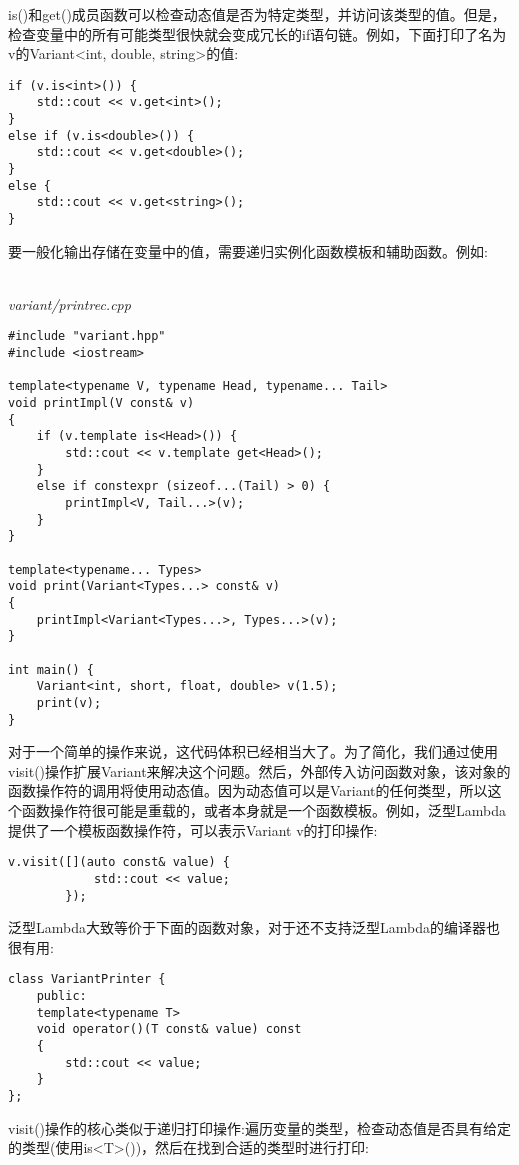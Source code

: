 
is()和get()成员函数可以检查动态值是否为特定类型，并访问该类型的值。但是，检查变量中的所有可能类型很快就会变成冗长的if语句链。例如，下面打印了名为v的Variant<int, double, string>的值:

\begin{lstlisting}[style=styleCXX]
if (v.is<int>()) {
	std::cout << v.get<int>();
}
else if (v.is<double>()) {
	std::cout << v.get<double>();
}
else {
	std::cout << v.get<string>();
}
\end{lstlisting}

要一般化输出存储在变量中的值，需要递归实例化函数模板和辅助函数。例如:

\hspace*{\fill} \\ %
\noindent
\textit{variant/printrec.cpp}
\begin{lstlisting}[style=styleCXX]
#include "variant.hpp"
#include <iostream>

template<typename V, typename Head, typename... Tail>
void printImpl(V const& v)
{
	if (v.template is<Head>()) {
		std::cout << v.template get<Head>();
	}
	else if constexpr (sizeof...(Tail) > 0) {
		printImpl<V, Tail...>(v);
	}
}

template<typename... Types>
void print(Variant<Types...> const& v)
{
	printImpl<Variant<Types...>, Types...>(v);
}

int main() {
	Variant<int, short, float, double> v(1.5);
	print(v);
}
\end{lstlisting}

对于一个简单的操作来说，这代码体积已经相当大了。为了简化，我们通过使用visit()操作扩展Variant来解决这个问题。然后，外部传入访问函数对象，该对象的函数操作符的调用将使用动态值。因为动态值可以是Variant的任何类型，所以这个函数操作符很可能是重载的，或者本身就是一个函数模板。例如，泛型Lambda提供了一个模板函数操作符，可以表示Variant v的打印操作:

\begin{lstlisting}[style=styleCXX]
v.visit([](auto const& value) {
			std::cout << value;
		});
\end{lstlisting}

泛型Lambda大致等价于下面的函数对象，对于还不支持泛型Lambda的编译器也很有用:

\begin{lstlisting}[style=styleCXX]
class VariantPrinter {
	public:
	template<typename T>
	void operator()(T const& value) const
	{
		std::cout << value;
	}
};
\end{lstlisting}

visit()操作的核心类似于递归打印操作:遍历变量的类型，检查动态值是否具有给定的类型(使用is<T>())，然后在找到合适的类型时进行打印:

